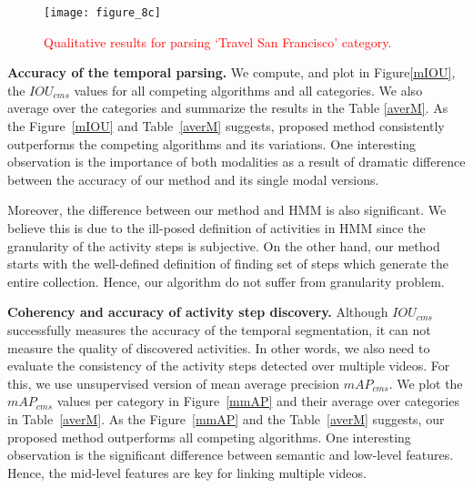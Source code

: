 \begin{figure}[t]
  \texttt{[image: figure\_8c]}
  \vspace{-6mm}
  \caption{\textcolor{red}{Qualitative results for parsing `Travel San Francisco' category.}}
  \vspace{-2mm}
  \label{sf}
\end{figure}


\vspace{1mm}
\noindent\textbf{Accuracy of the temporal parsing.}
We compute, and plot in Figure\ref{mIOU}, the $IOU_{cms}$ values for all competing algorithms and all categories. We also average over the categories and summarize the results in the Table \ref{averM}. As the Figure~\ref{mIOU} and Table~\ref{averM} suggests, proposed method consistently outperforms the competing algorithms and its variations. One interesting observation is the importance of both modalities as a result of dramatic difference between the accuracy of our method and its single modal versions.

Moreover, the difference between our method and HMM is also significant. We believe this is due to the ill-posed definition of activities in HMM since the granularity of the activity steps is subjective. On the other hand, our method starts with the well-defined definition of finding set of steps which generate the entire collection. Hence, our algorithm do not suffer from granularity problem.
\begin{table}
\caption{Average of $IOU_{cms}$ and $mAP_{cms}$ over recipes.}
{\small
{}}
\normalsize
\label{averM}
\vspace{-5mm}
\end{table}

\vspace{1mm}
\noindent\textbf{Coherency and accuracy of activity step discovery.}
Although $IOU_{cms}$ successfully measures the accuracy of the temporal segmentation, it can not measure the quality of discovered activities. In other words, we also need to evaluate the consistency of the activity steps detected over multiple videos. For this, we use unsupervised version of mean average precision $mAP_{cms}$. We plot the $mAP_{cms}$ values per category in Figure~\ref{mmAP} and their average over categories in Table~\ref{averM}. As the Figure~\ref{mmAP} and the Table~\ref{averM} suggests, our proposed method outperforms all competing algorithms. One interesting observation is the significant difference between semantic and low-level features. Hence, the mid-level features are key for linking multiple videos.


